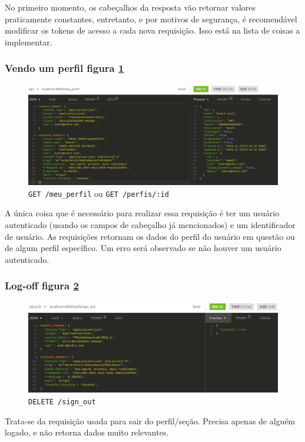 No primeiro momento, os cabeçalhos da resposta vão retornar valores praticamente constantes, entretanto, e por motivos de
segurança, é recomendável modificar os tokens de acesso a cada nova requisição. Isso está na lista de coisas a implementar.

\subsubsection{Vendo um perfil \hfill figura \ref{fig:ver-perfil}}
\begin{figure}[ht]
  \centering
  \includegraphics[width=.75\textwidth]{figuras/ver-perfil.png}
  \caption{\texttt{GET /meu\_perfil} ou \texttt{GET /perfis/:id}}
  \label{fig:ver-perfil}
\end{figure}

A única coisa que é necessário para realizar essa requisição é ter um usuário autenticado (usando os campos de cabeçalho
já mencionados) e um identificador de usuário. As requisições retornam os dados do perfil do usuário em questão ou de
algum perfil específico. Um erro será observado se não houver um usuário autenticado.

\subsubsection{Log-off \hfill figura \ref{fig:saindo}}

\begin{figure}[ht]
  \centering
  \includegraphics[width=.75\textwidth]{figuras/sign-out.png}
  \caption{\texttt{DELETE /sign\_out}}
  \label{fig:saindo}
\end{figure}

Trata-se da requisição usada para sair do perfil/seção. Precisa apenas de alguém logado, e não retorna dados muito relevantes.


